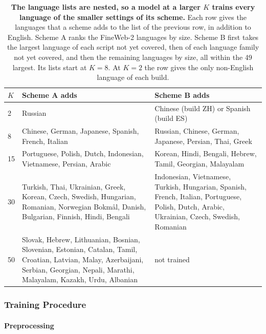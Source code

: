 \begin{table}[t]
\centering
\small
\setlength{\tabcolsep}{4pt}
\begin{tabular*}{\textwidth}{@{\extracolsep{\fill}}lp{}p{}@{}}
\toprule
$K$ & Scheme A adds & Scheme B adds \\
\midrule
2 & Russian & Chinese (build ZH) or Spanish (build ES) \\
8 & Chinese, German, Japanese, Spanish, French, Italian & Russian, Chinese, German, Japanese, Persian, Thai, Greek \\
15 & Portuguese, Polish, Dutch, Indonesian, Vietnamese, Persian, Arabic & Korean, Hindi, Bengali, Hebrew, Tamil, Georgian, Malayalam \\
30 & Turkish, Thai, Ukrainian, Greek, Korean, Czech, Swedish, Hungarian, Romanian, Norwegian Bokm\aa{}l, Danish, Bulgarian, Finnish, Hindi, Bengali & Indonesian, Vietnamese, Turkish, Hungarian, Spanish, French, Italian, Portuguese, Polish, Dutch, Arabic, Ukrainian, Czech, Swedish, Romanian \\
50 & Slovak, Hebrew, Lithuanian, Bosnian, Slovenian, Estonian, Catalan, Tamil, Croatian, Latvian, Malay, Azerbaijani, Serbian, Georgian, Nepali, Marathi, Malayalam, Kazakh, Urdu, Albanian & not trained \\
\bottomrule
\end{tabular*}
\caption{\textbf{The language lists are nested, so a model at a larger $K$ trains every language of the smaller settings of its scheme.} Each row gives the languages that a scheme adds to the list of the previous row, in addition to English. Scheme A ranks the FineWeb-2 languages by size. Scheme B first takes the largest language of each script not yet covered, then of each language family not yet covered, and then the remaining languages by size, all within the 49 largest. Its lists start at $K=8$. At $K=2$ the row gives the only non-English language of each build.}
\label{tab:card-languages}
\end{table}

\subsubsection*{Training Procedure}

\paragraph{Preprocessing}

